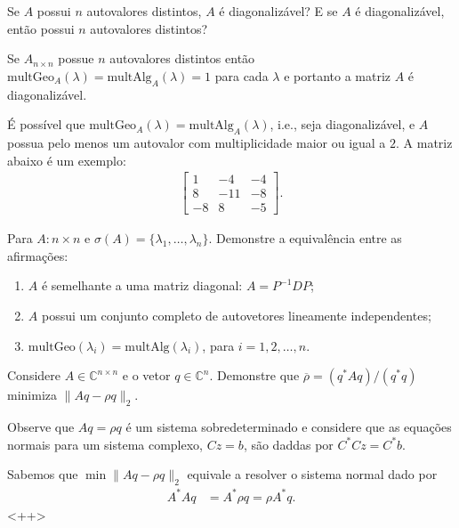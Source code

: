 \documentclass[a4paper,12pt, leqno, answers]{exam}
\begin{document}
\begin{questions}
     Se $A$ possui $n$ autovalores distintos, $A$ \'{e} diagonaliz\'{a}vel? E se $A$ \'{e} diagonaliz\'{a}vel, ent\~{a}o possui $n$ autovalores distintos?
    \begin{solution}
        Se $A_{n \times n}$ possue $n$ autovalores distintos ent\~{a}o $\text{multGeo}_A(\lambda) = \text{multAlg}_A(\lambda) = 1$ para cada $\lambda$ e portanto a matriz $A$ \'{e} diagonaliz\'{a}vel.

        \'{E} poss\'{i}vel que $\text{multGeo}_A(\lambda) = \text{multAlg}_A(\lambda)$, i.e., seja diagonaliz\'{a}vel, e $A$ possua pelo menos um autovalor com multiplicidade maior ou igual a $2$. A matriz abaixo \'{e} um exemplo:
        \begin{align*}
            \begin{bmatrix}
                1 & -4 & -4 \\
                8 & -11 & - 8 \\
                -8 & 8 & -5
            \end{bmatrix}.
        \end{align*}
    \end{solution}

    \question Para $A : n \times n$ e $\sigma(A) = \{ \lambda_1, \ldots, \lambda_n \}$. Demonstre a equival\^{e}ncia entre as afirma\c{c}\~{o}es:
    \begin{enumerate}
        \item $A$ \'{e} semelhante a uma matriz diagonal: $A = P^{-1} D P$;
        \item $A$ possui um conjunto completo de autovetores lineamente independentes;
        \item $\mathrm{multGeo}(\lambda_i) = \mathrm{multAlg}(\lambda_i)$, para $i = 1, 2, \ldots, n$.
    \end{enumerate}
    \begin{solution}
    \end{solution}

     Considere $A \in \mathbb{C}^{n \times n}$ e o vetor $q \in \mathbb{C}^n$. Demonstre que $\overline{\rho} = \left( q^* A q \right) / \left( q^* q \right)$ minimiza $\| A q - \rho q \|_2$.

    Observe que $A q = \rho q$ \'{e} um sistema sobredeterminado e considere que as equa\c{c}\~{o}es normais para um sistema complexo, $C z = b$, s\~{a}o daddas por $C^* C z = C^* b$.
    \begin{solution}
        Sabemos que $\min \| A q - \rho q \|_2$ equivale a resolver o sistema normal dado por
        \begin{align*}
            A^* A q &= A^* \rho q = \rho A^* q.
        \end{align*}<++>
    \end{solution}


\end{questions}
\end{document}
